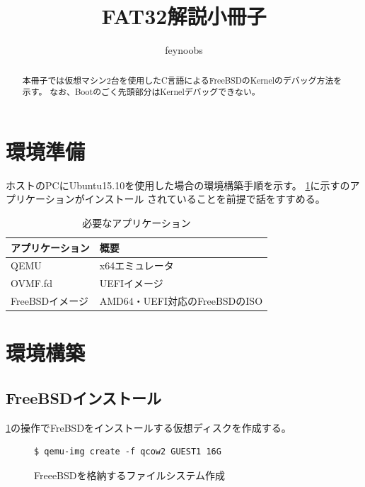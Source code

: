 \documentclass[a4j]{jarticle}
\title{FAT32解説小冊子}
\author{feynoobs}
\begin{document}
\maketitle

\begin{abstract}
本冊子では仮想マシン2台を使用したC言語によるFreeBSDのKernelのデバッグ方法を示す。
なお、Bootのごく先頭部分はKernelデバッグできない。

\end{abstract}
\begin{multicols}{2}

\section{環境準備}
ホストのPCにUbuntu15.10を使用した場合の環境構築手順を示す。
\ref{tb:FreeBSD:_ENV}に示すのアプリケーションがインストール
されていることを前提で話をすすめる。
\begin{table}[htp]
	\caption{必要なアプリケーション}
	\label{tb:FreeBSD:_ENV}
	\begin{center}
		\begin{tabular}{l|p{10cm}}										\hline
			アプリケーション	&	概要							\\	\hline
			QEMU				&	x64エミュレータ				\\	\hline	\hline
			OVMF.fd				&	UEFIイメージ					\\	\hline	\hline
			FreeBSDイメージ		&	AMD64・UEFI対応のFreeBSDのISO	\\	\hline
		\end{tabular}
	\end{center}
\end{table}

\section{環境構築}
\subsection{FreeBSDインストール}
\ref{fig:FreeBSD_CREATE}の操作でFreBSDをインストールする仮想ディスクを作成する。
\begin{figure}[htbp]
	\begin{center}
  		\begin{lstlisting}[basicstyle=\ttfamily\footnotesize, frame=single, breaklines=true]
$ qemu-img create -f qcow2 GUEST1 16G
  		\end{lstlisting}
	\end{center}
	\caption{FreeeBSDを格納するファイルシステム作成}
	\label{fig:FreeBSD_CREATE}
\end{figure}


\end{multicols}
\end{document}
